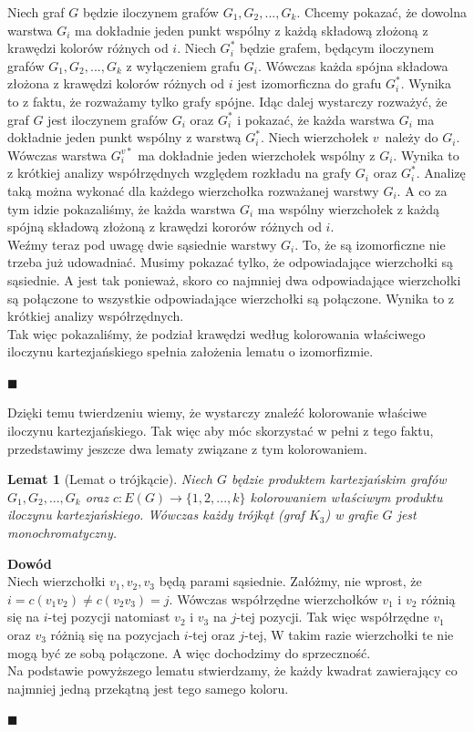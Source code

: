 \documentclass[12pt,a4paper,titlepage]{article}
\newtheorem{lem}[twr]{Lemat}
\newcommand\tab[1][1cm]{\hspace*{#1}}
\begin{document}
\tab[0.6cm]Niech graf $G$ będzie iloczynem grafów $G_1, G_2, ..., G_k$. Chcemy pokazać, że dowolna warstwa $G_i$ ma dokładnie jeden punkt wspólny z każdą składową złożoną z krawędzi kolorów różnych od $i$. Niech $G_i ^*$ będzie grafem, będącym iloczynem grafów $G_1, G_2, ..., G_k$ z wyłączeniem grafu $G_i$. Wówczas każda spójna składowa złożona z krawędzi kolorów różnych od $i$ jest izomorficzna do grafu $G_i^*$. Wynika to z faktu, że rozważamy tylko grafy spójne. Idąc dalej wystarczy rozważyć, że graf $G$ jest iloczynem grafów $G_i$ oraz $G_i^*$ i pokazać, że każda warstwa $G_i$ ma dokładnie jeden punkt wspólny z warstwą $G_i^*$. Niech wierzchołek $v$~należy do $G_i$. Wówczas warstwa $G_i^{v*}$ ma dokładnie jeden wierzchołek wspólny z $G_i$. Wynika to z krótkiej analizy współrzędnych względem rozkładu na grafy $G_i$ oraz $G_i^*$. Analizę taką można wykonać dla każdego wierzchołka rozważanej warstwy $G_i$. A co za tym idzie pokazaliśmy, że każda warstwa $G_i$ ma wspólny wierzchołek z każdą spójną składową złożoną z krawędzi kororów różnych od $i$.\\
\tab[0.6cm]Weźmy teraz pod uwagę dwie sąsiednie warstwy $G_i$. To, że są izomorficzne nie trzeba już udowadniać. Musimy pokazać tylko, że odpowiadające wierzchołki są sąsiednie. A jest tak ponieważ, skoro co najmniej dwa odpowiadające wierzchołki są połączone to wszystkie odpowiadające wierzchołki są połączone. Wynika to z krótkiej analizy współrzędnych.\\
\tab[0.6cm]Tak więc pokazaliśmy, że podział krawędzi według kolorowania właściwego iloczynu kartezjańskiego spełnia założenia lematu o izomorfizmie.
\begin{flushright}
$\blacksquare$
\end{flushright}
\tab[0.6cm]Dzięki temu twierdzeniu wiemy, że wystarczy znaleźć kolorowanie właściwe iloczynu kartezjańskiego. Tak więc aby móc skorzystać w pełni z tego faktu, przedstawimy jeszcze dwa lematy związane z tym kolorowaniem.\\
 
\begin{lem}[Lemat o trójkącie]
\label{lem:trojkat}
Niech $G$ będzie produktem kartezjańskim grafów $G_1, G_2, ... , G_k$ oraz $c: E(G) \rightarrow \{1,2,...,k\}$ kolorowaniem właściwym produktu iloczynu kartezjańskiego. Wówczas każdy trójkąt (graf $K_3$) w grafie $G$ jest monochromatyczny.
\end{lem}
\tab[-0.6cm]\textbf{Dowód}\\
\tab[0.6cm]Niech wierzchołki $v_1, v_2, v_3$ będą parami sąsiednie. Załóżmy, nie wprost, że $i=c(v_1 v_2 ) \neq c(v_2 v_3)=j$. Wówczas współrzędne wierzchołków $v_1$ i $v_2$ różnią się na $i$-tej pozycji natomiast $v_2$ i $v_3$ na $j$-tej pozycji. Tak więc współrzędne $v_1$ oraz $v_3$ różnią się na pozycjach $i$-tej oraz $j$-tej, W takim razie wierzchołki te nie mogą być ze sobą połączone. A więc dochodzimy do sprzeczność.\\
Na podstawie powyższego lematu stwierdzamy, że każdy kwadrat zawierający co najmniej jedną przekątną jest tego samego koloru.
\begin{flushright}
$\blacksquare$
\end{flushright}
\end{document}
